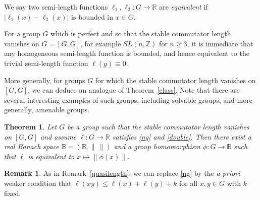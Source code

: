 \documentclass[11pt,a4paper,reqno]{amsart}
\numberwithin{equation}{section}
\theoremstyle{plain}
\newtheorem{theorem}[equation]{Theorem}
\theoremstyle{definition}
\newtheorem{remark}[equation]{Remark}
\newcommand\R{\mathbb{R}}
\newcommand\Z{\mathbb{Z}}
\newcommand\normsymb{\ell}  %
\newcommand\norm[1]{\ell({#1})}   %
\begin{document}
We say two { { semi-}length} functions $\normsymb_1,\normsymb_2: G
\to\R$ are \emph{equivalent} if $|\normsymb_1(x) - \normsymb_2(x)|$ is bounded in $x\in G$.

For a group $G$ which is perfect and so that the stable commutator length
vanishes on $G=[G, G]$, for example $SL(n,\Z)$ for $n \geq 3$, it is
immediate that any {homogeneous semi-}length function is bounded,
and hence equivalent to the trivial { semi-}length function
$\normsymb(g)\equiv 0$.

More generally, for groups $G$ for which the stable commutator length
vanishes on $[G,G]$, we can deduce an analogue of Theorem~\ref{class}.
Note that there are several interesting examples of such groups,
including solvable groups, and more generally, amenable groups.

\begin{theorem}\label{quasi}
Let $G$ be a group such that the stable commutator length vanishes on
$[G, G]$ and assume $\normsymb: G \to \R$ satisfies \eqref{ng} and \eqref{double}.
Then there exist a real Banach space $\mathbb{B} = (\mathbb{B},\| \, \|)$
and a group homomorphism $\phi : G \to \mathbb{B}$ such that $\normsymb$
is equivalent to $x\mapsto \| \phi(x) \|$.
\end{theorem}
\begin{remark}
  {As in Remark~\ref{quasilength}, we can replace \eqref{ng} by the \emph{a priori}
  weaker condition that $\norm{xy} \leq \norm{x} + \norm{y} + k$ for all $x, y\in G$ with $k$ fixed.}
\end{remark}
\end{document}
